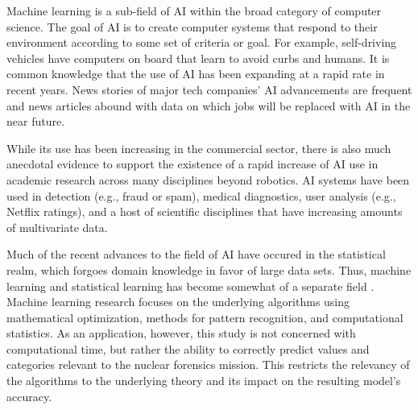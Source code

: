 Machine learning is a sub-field of \gls{AI} within the broad category of
computer science. The goal of \gls{AI} is to create computer systems that
respond to their environment according to some set of criteria or goal. For
example, self-driving vehicles have computers on board that learn to avoid
curbs and humans. It is common knowledge that the use of \gls{AI} has been
expanding at a rapid rate in recent years. News stories of major tech
companies' \gls{AI} advancements are frequent and news articles abound with
data on which jobs will be replaced with \gls{AI} in the near future. 

While its use has been increasing in the commercial sector, there is also much
anecdotal evidence to support the existence of a rapid increase of \gls{AI} use
in academic research across many disciplines beyond robotics. \gls{AI} systems
have been used in detection (e.g., fraud or spam), medical diagnostics, user
analysis (e.g., Netflix ratings), and a host of scientific disciplines that
have increasing amounts of multivariate data.

Much of the recent advances to the field of \gls{AI} have occured in the
statistical realm, which forgoes domain knowledge in favor of large data sets.
Thus, machine learning and statistical learning has become somewhat of a
separate field \cite{changingml}. Machine learning research focuses on the
underlying algorithms using mathematical optimization, methods for pattern
recognition, and computational statistics.  As an application, however, this
study is not concerned with computational time, but rather the ability to
correctly predict values and categories relevant to the nuclear forensics
mission. This restricts the relevancy of the algorithms to the underlying
theory and its impact on the resulting model's accuracy. 

